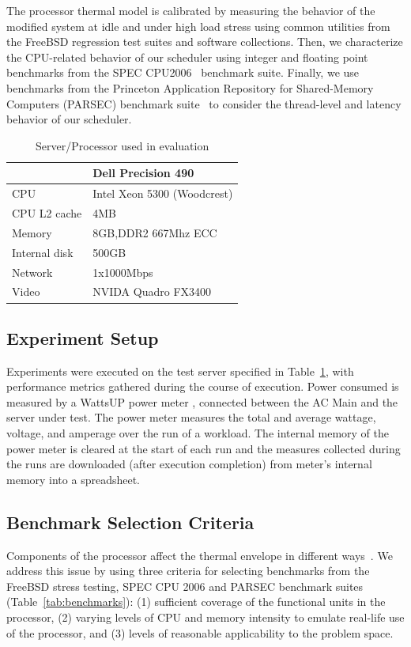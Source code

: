 \documentclass[times, 10pt,twocolumn]{IEEEtran}
\begin{document}
The processor thermal model is calibrated by measuring the behavior of
the modified system at idle and under high load stress using common
utilities from the FreeBSD regression test suites and software
collections. Then, we characterize the CPU-related behavior of our
scheduler using integer and floating point benchmarks from the SPEC
CPU2006~\cite{Henning2006} benchmark suite. Finally, we use benchmarks
from the Princeton Application Repository for Shared-Memory Computers
(PARSEC) benchmark suite~\cite{Bienia2008} to consider the thread-level
and latency behavior of our scheduler.

\begin{table}[tbhp] \centering
  \caption{Server/Processor used in evaluation}
  \label{tab:hardware}
  \begin{tabular}{l l} 
\hline 
&\textbf{Dell Precision 490}\\ 
\hline
\hline 
CPU&Intel Xeon 5300 (Woodcrest)\\ 
CPU L2 cache&4MB\\ 
Memory&8GB,DDR2 667Mhz ECC\\
Internal disk&500GB\\ 
Network&1x1000Mbps\\ 
Video&NVIDA Quadro FX3400\\ 
\hline
  \end{tabular}
\end{table}
\subsection{Experiment Setup}
\label{sec:experiment-setup} Experiments were executed on the test
server specified in Table~\ref{tab:hardware}, with performance metrics
gathered during the course of execution. Power consumed is measured by a
WattsUP power meter \cite{WattsUp2006a}, connected between the AC Main
and the server under test.  The power meter measures the total and
average wattage, voltage, and amperage over the run of a workload.  The
internal memory of the power meter is cleared at the start of each run
and the measures collected during the runs are downloaded (after
execution completion) from meter's internal memory into a spreadsheet.

\subsection{Benchmark Selection Criteria}
\label{sec:experimental-setup-1} Components of the processor affect the
thermal envelope in different ways~\cite{Kumar2008}. We address this
issue by using three criteria for selecting benchmarks from the FreeBSD
stress testing, SPEC CPU 2006 and PARSEC benchmark suites
(Table~\ref{tab:benchmarks}): (1) sufficient coverage of the functional
units in the processor, (2) varying levels of CPU and memory intensity
to emulate real-life use of the processor, and (3) levels of reasonable
applicability to the problem space.
\end{document}
